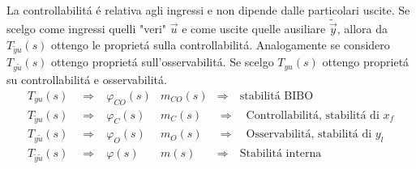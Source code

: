 \documentclass[../main.tex]{subfiles}
\begin{document}
		La controllabilit\'a \'e relativa agli ingressi e non dipende dalle particolari uscite. Se scelgo come ingressi quelli "veri" $ \vec u $ e come uscite quelle ausiliare $ \tilde{\vec y} $, allora da $ T_{\tilde y u}(s) $ ottengo le propriet\'a sulla controllabilit\'a. Analogamente se considero $ T_{y \tilde u}(s) $ ottengo propriet\'a sull'osservabilit\'a. Se scelgo $ T_{yu}(s) $ ottengo propriet\'a su controllabilit\'a e osservabilit\'a.
		\[
			\begin{array}{llll}
				T_{yu}(s) \quad\Rightarrow & \varphi_{CO}(s) & m_{CO}(s) & \Rightarrow\quad \text{stabilit\'a BIBO}
				\\ 
				T_{\tilde y u}(s) \quad\Rightarrow & \varphi_C(s) & m_C(s) & \Rightarrow\quad \text{Controllabilit\'a, stabilit\'a di } x_f
				\\ 
				T_{y \tilde u}(s) \quad\Rightarrow & \varphi_O(s) & m_O(s) & \Rightarrow\quad \text{Osservabilit\'a, stabilit\'a di } y_l
				\\ 
				T_{\tilde y \tilde u}(s) \quad\Rightarrow & \varphi(s) & m(s) & \Rightarrow\quad \text{Stabilit\'a interna}
			\end{array}
		\]
		
\end{document}
